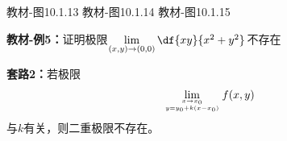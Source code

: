 \begin{center}
	\quad
	
	教材-图10.1.13\hspace{2cm} 教材-图10.1.14\hspace{2cm} 教材-图10.1.15
\end{center}

{\bf 教材-例5：}证明极限$\lim\limits_{(x,y)\to(0,0)}\df{xy}{x^2+y^2}$不存在

{\bf 套路2：}若极限
$$\lim\limits_{{x\to x_0}\atop{y=y_0+k(x-x_0)}}f(x,y)$$
与$k$有关，则二重极限不存在。

